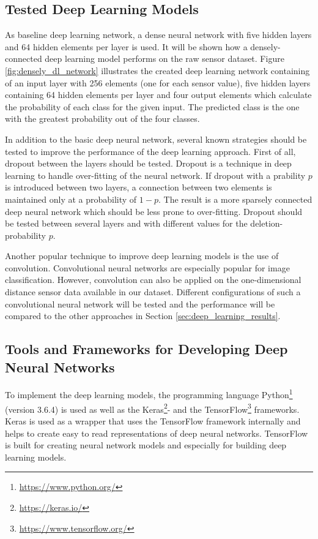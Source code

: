 \subsection{Tested Deep Learning Models}

As baseline deep learning network, a dense neural network with five hidden layers and 64 hidden elements per layer is used. It will be shown how a densely-connected deep learning model performs on the raw sensor dataset. Figure \ref{fig:densely_dl_network} illustrates the created deep learning network containing of an input layer with 256 elements (one for each sensor value), five hidden layers containing 64 hidden elements per layer and four output elements which calculate the probability of each class for the given input. The predicted class is the one with the greatest probability out of the four classes. 

In addition to the basic deep neural network, several known strategies should be tested to improve the performance of the deep learning approach. First of all, dropout between the layers should be tested. Dropout is a technique in deep learning to handle over-fitting of the neural network. If dropout with a prability $p$ is introduced between two layers, a connection between two elements is maintained only at a probability of $1-p$. The result is a more sparsely connected deep neural network which should be less prone to over-fitting. Dropout should be tested between several layers and with different values for the deletion-probability $p$.

Another popular technique to improve deep learning models is the use of convolution. Convolutional neural networks are especially popular for image classification. However, convolution can also be applied on the one-dimensional distance sensor data available in our dataset. Different configurations of such a convolutional neural network will be tested and the performance will be compared to the other approaches in Section \ref{sec:deep_learning_results}.




\subsection{Tools and Frameworks for Developing Deep Neural Networks}

To implement the deep learning models, the programming language Python\footnote{\url{https://www.python.org/}} (version 3.6.4) is used as well as the Keras\footnote{\url{https://keras.io/}}- and the TensorFlow\footnote{\url{https://www.tensorflow.org/}} frameworks. Keras is used as a wrapper that uses the TensorFlow framework internally and helps to create easy to read representations of deep neural networks. TensorFlow is built for creating neural network models and especially for building deep learning models. 


